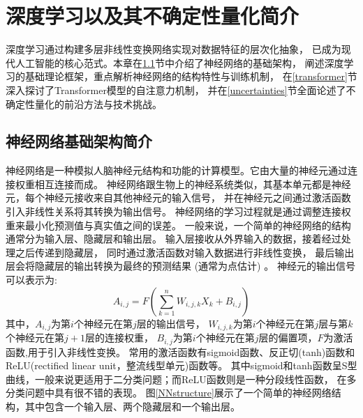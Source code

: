 \chapter{深度学习以及其不确定性量化简介}

深度学习通过构建多层非线性变换网络实现对数据特征的层次化抽象，
已成为现代人工智能的核心范式。本章在\ref{intro-NN}节中介绍了神经网络的基础架构，
阐述深度学习的基础理论框架，重点解析神经网络的结构特性与训练机制，
在\ref{transformer}节深入探讨了Transformer模型的自注意力机制，
并在\ref{uncertainties}节全面论述了不确定性量化的前沿方法与技术挑战。

\section{神经网络基础架构简介}\label{intro-NN}

神经网络是一种模拟人脑神经元结构和功能的计算模型。它由大量的神经元通过连接权重相互连接而成。
神经网络跟生物上的神经系统类似，其基本单元都是神经元，每个神经元接收来自其他神经元的输入信号，
并在神经元之间通过激活函数引入非线性关系将其转换为输出信号。
神经网络的学习过程就是通过调整连接权重来最小化预测值与真实值之间的误差。
一般来说，一个简单的神经网络的结构通常分为输入层、隐藏层和输出层。
输入层接收从外界输入的数据，接着经过处理之后传递到隐藏层，
同时通过激活函数对输入数据进行非线性变换，
最后输出层会将隐藏层的输出转换为最终的预测结果 (通常为点估计) 。
神经元的输出信号可以表示为:
\begin{equation}
  A_{i,j} = F\left(\sum_{k=1}^{n} W_{i,j,k} X_k + B_{i,j}\right)
\end{equation}
其中，$A_{i,j}$为第$i$个神经元在第$j$层的输出信号，
$W_{i,j,k}$为第$i$个神经元在第$j$层与第$k$个神经元在第$j+1$层的连接权重，
$B_{i,j}$为第$i$个神经元在第$j$层的偏置项，$F$为激活函数,用于引入非线性变换。
常用的激活函数有sigmoid函数、反正切(tanh)函数和ReLU(rectified linear unit，整流线型单元)函数等。
其中sigmoid和tanh函数呈S型曲线，一般来说更适用于二分类问题；而ReLU函数则是一种分段线性函数，
在多分类问题中具有很不错的表现。
图\ref{NNstructure}展示了一个简单的神经网络结构，其中包含一个输入层、两个隐藏层和一个输出层。

